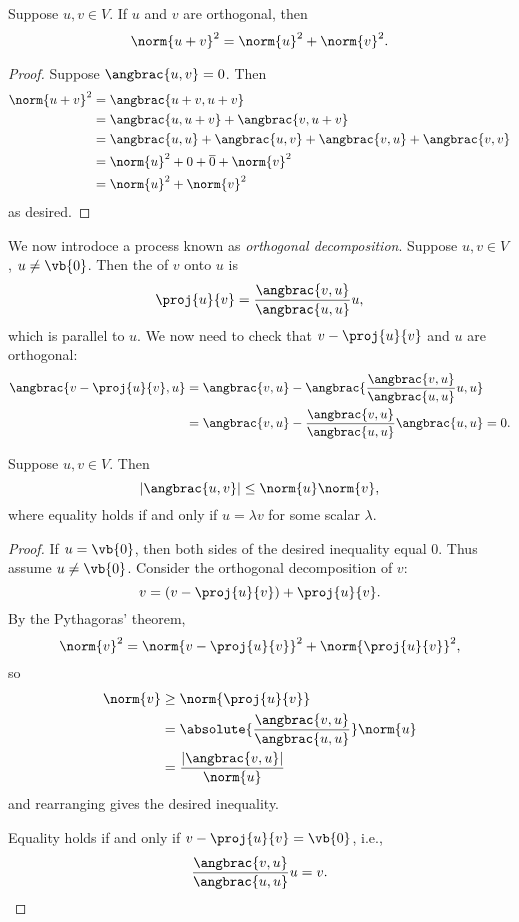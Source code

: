 \begin{lemma}
Suppose $u,v\in V$. If $u$ and $v$ are orthogonal, then
\begin{equation}
\norm{u+v}^2=\norm{u}^2+\norm{v}^2.
\end{equation}
\end{lemma}

\begin{proof}
Suppose $\angbrac{u,v}=0$. Then
\begin{align*}
\norm{u+v}^2
&=\angbrac{u+v,u+v}\\
&=\angbrac{u,u+v}+\angbrac{v,u+v}\\
&=\angbrac{u,u}+\angbrac{u,v}+\angbrac{v,u}+\angbrac{v,v}\\
&=\norm{u}^2+0+\overline{0}+\norm{v}^2\\
&=\norm{u}^2+\norm{v}^2
\end{align*}
as desired.
\end{proof}

We now introdoce a process known as \emph{orthogonal decomposition}.
Suppose $u,v\in V$, $u\neq\vb{0}$.
Then the  of $v$ onto $u$ is
\[\proj{u}{v}=\frac{\angbrac{v,u}}{\angbrac{u,u}}u,\]
which is parallel to $u$. We now need to check that $v-\proj{u}{v}$ and $u$ are orthogonal:
\begin{align*}
\angbrac{v-\proj{u}{v},u}
&=\angbrac{v,u}-\angbrac{\frac{\angbrac{v,u}}{\angbrac{u,u}}u,u}\\
&=\angbrac{v,u}-\frac{\angbrac{v,u}}{\angbrac{u,u}}\angbrac{u,u}=0.
\end{align*}

\begin{lemma}
Suppose $u,v\in V$. Then
\begin{equation}
|\angbrac{u,v}|\le\norm{u}\norm{v},
\end{equation}
where equality holds if and only if $u=\lambda v$ for some scalar $\lambda$.
\end{lemma}

\begin{proof}
If $u=\vb{0}$, then both sides of the desired inequality equal $0$. Thus assume $u\neq\vb{0}$. Consider the orthogonal decomposition of $v$:
\[v=(v-\proj{u}{v})+\proj{u}{v}.\]
By the Pythagoras' theorem,
\[\norm{v}^2=\norm{v-\proj{u}{v}}^2+\norm{\proj{u}{v}}^2,\]
so
\begin{align*}
\norm{v}&\ge\norm{\proj{u}{v}}\\
&=\absolute{\frac{\angbrac{v,u}}{\angbrac{u,u}}}\norm{u}\\
&=\frac{|\angbrac{v,u}|}{\norm{u}}
\end{align*}
and rearranging gives the desired inequality.

Equality holds if and only if $v-\proj{u}{v}=\vb{0}$, i.e.,
\[\frac{\angbrac{v,u}}{\angbrac{u,u}}u=v.\]
\end{proof}

